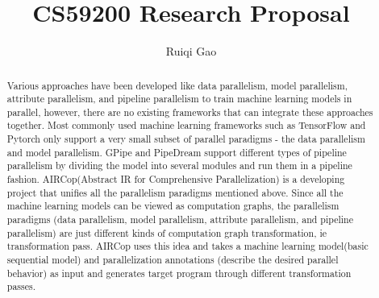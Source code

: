 \documentclass[sigplan,nonacm]{acmart}
\begin{document}
\title{CS59200 Research Proposal}

\author{Ruiqi Gao}




\begin{abstract}
Various approaches have been developed like data parallelism, model parallelism, attribute parallelism, and pipeline parallelism to train machine learning models in parallel, however, there are no existing frameworks that can integrate these approaches together. Most commonly used machine learning frameworks such as TensorFlow and Pytorch only support a very small subset of parallel paradigms - the data parallelism and model parallelism. GPipe and PipeDream support different types of pipeline parallelism by dividing the model into several modules and run them in a pipeline fashion.
AIRCop(Abstract IR for Comprehensive Parallelization) is a developing project that unifies all the parallelism paradigms mentioned above. Since all the machine learning models can be viewed as computation graphs, the parallelism paradigms (data parallelism, model parallelism, attribute parallelism, and pipeline parallelism) are just different kinds of computation graph transformation, ie transformation pass. AIRCop uses this idea and takes a machine learning model(basic sequential model) and parallelization annotations (describe the desired parallel behavior) as input and generates target program through different transformation passes.
	
\end{abstract}
\end{document}
